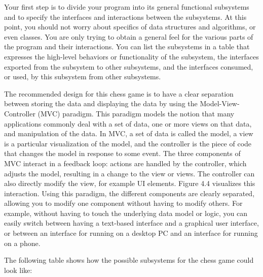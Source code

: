
Your first step is to divide your program into its general functional subsystems and to specify the interfaces and interactions between the subsystems. At this point, you should not worry about specifics of data structures and algorithms, or even classes. You are only trying to obtain a general feel for the various parts of the program and their interactions. You can list the subsystems in a table that expresses the high-level behaviors or functionality of the subsystem, the interfaces exported from the subsystem to other subsystems, and the interfaces consumed, or used, by this subsystem from other subsystems.

The recommended design for this chess game is to have a clear separation between storing the data and displaying the data by using the Model-View-Controller (MVC) paradigm. This paradigm models the notion that many applications commonly deal with a set of data, one or more views on that data, and manipulation of the data. In MVC, a set of data is called the model, a view is a particular visualization of the model, and the controller is the piece of code that changes the model in response to some event. The three components of MVC interact in a feedback loop: actions are handled by the controller, which adjusts the model, resulting in a change to the view or views. The controller can also directly modify the view, for example UI elements. Figure 4.4 visualizes this interaction. Using this paradigm, the different components are clearly separated, allowing you to modify one component without having to modify others. For example, without having to touch the underlying data model or logic, you can easily switch between having a text-based interface and a graphical user interface, or between an interface for running on a desktop PC and an interface for running on a phone.


The following table shows how the possible subsystems for the chess game could look like:

